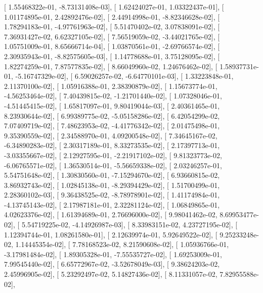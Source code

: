 \documentclass{article}
\begin{document}
       [  1.55468322e-01,  -8.73131408e-03],
       [  1.62424027e-01,   1.03322437e-01],
       [  1.01174895e-01,   2.42892476e-02],
       [  2.44914998e-01,  -8.82346628e-02],
       [  1.78294183e-01,  -4.97761963e-02],
       [  5.51470402e-02,   3.07838091e-02],
       [  7.36931427e-02,   6.62327105e-02],
       [  7.56519059e-02,  -3.44021765e-02],
       [  1.05751009e-01,   8.65666714e-04],
       [  1.03870561e-01,  -2.69766574e-02],
       [  2.30935943e-01,  -8.82575605e-03],
       [  1.14778688e-01,   3.75128095e-02],
       [  1.82274259e-01,   7.87577835e-02],
       [  8.66049960e-02,   1.24676462e-02],
       [  1.58937731e-01,  -5.16747329e-02],
       [  6.59026257e-02,  -6.64770101e-03],
       [  1.33223848e-01,   2.11370100e-02],
       [  1.05916388e-01,   2.38390879e-02],
       [  1.15673774e-01,  -4.56253464e-02],
       [  7.40439815e-02,  -1.21701440e-02],
       [  1.07328046e-01,  -4.51445415e-02],
       [  1.65817097e-01,   9.80419044e-03],
       [  2.40361465e-01,   8.23930644e-02],
       [  6.99389775e-02,  -5.05158286e-02],
       [  6.42054299e-02,   7.07409719e-02],
       [  7.48623953e-02,  -4.41776342e-02],
       [  2.01475498e-01,   9.35390559e-02],
       [  2.34588970e-01,   4.09200548e-02],
       [  7.34645167e-02,  -6.34890283e-02],
       [  2.30317189e-01,   8.33273535e-02],
       [  2.17397713e-01,  -3.03355667e-02],
       [  2.12927595e-01,  -2.21917102e-02],
       [  9.81323773e-02,  -6.06765571e-02],
       [  1.36530514e-01,  -5.56659338e-02],
       [  2.03246257e-01,   5.54751648e-02],
       [  1.30830560e-01,  -7.15294670e-02],
       [  6.93660815e-02,   3.86932743e-02],
       [  1.02845138e-01,  -8.29394429e-02],
       [  1.51700499e-01,   2.28360102e-03],
       [  9.36438525e-02,  -8.78978901e-02],
       [  1.41174984e-01,  -4.13745143e-02],
       [  2.17987181e-01,   2.32281124e-02],
       [  1.06849865e-01,   4.02623376e-02],
       [  1.61394689e-01,   2.76696000e-02],
       [  9.98041462e-02,   8.69953477e-02],
       [  5.54719225e-02,  -4.14926987e-03],
       [  8.33983151e-02,   4.23727195e-02],
       [  1.12394744e-01,   1.08261580e-01],
       [  2.12639974e-01,   5.92649522e-02],
       [  9.25233248e-02,   1.14445354e-02],
       [  7.78168523e-02,   8.21590608e-02],
       [  1.05936766e-01,  -3.17981484e-02],
       [  1.89305328e-01,  -7.55535727e-02],
       [  1.69253009e-01,   7.99545440e-02],
       [  6.65772967e-02,  -3.52678049e-03],
       [  9.38624203e-02,   2.45996905e-02],
       [  5.23292497e-02,   5.14827436e-02],
       [  8.11331057e-02,   7.82955588e-02],
\end{document}
